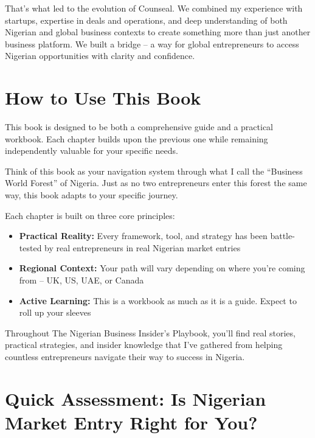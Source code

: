 That's what led to the evolution of Counseal. We combined my experience with startups, expertise in deals and operations, and deep understanding of both Nigerian and global business contexts to create something more than just another business platform. We built a bridge – a way for global entrepreneurs to access Nigerian opportunities with clarity and confidence.

\section{How to Use This Book}

\begin{importantbox}
This book is designed to be both a comprehensive guide and a practical workbook. Each chapter builds upon the previous one while remaining independently valuable for your specific needs.
\end{importantbox}

Think of this book as your navigation system through what I call the ``Business World Forest'' of Nigeria. Just as no two entrepreneurs enter this forest the same way, this book adapts to your specific journey.

Each chapter is built on three core principles:
\begin{itemize}
    \item \textbf{Practical Reality:} Every framework, tool, and strategy has been battle-tested by real entrepreneurs in real Nigerian market entries
    \item \textbf{Regional Context:} Your path will vary depending on where you're coming from – UK, US, UAE, or Canada
    \item \textbf{Active Learning:} This is a workbook as much as it is a guide. Expect to roll up your sleeves
\end{itemize}

Throughout The Nigerian Business Insider's Playbook, you'll find real stories, practical strategies, and insider knowledge that I've gathered from helping countless entrepreneurs navigate their way to success in Nigeria.


\section{Quick Assessment: Is Nigerian Market Entry Right for You?}

